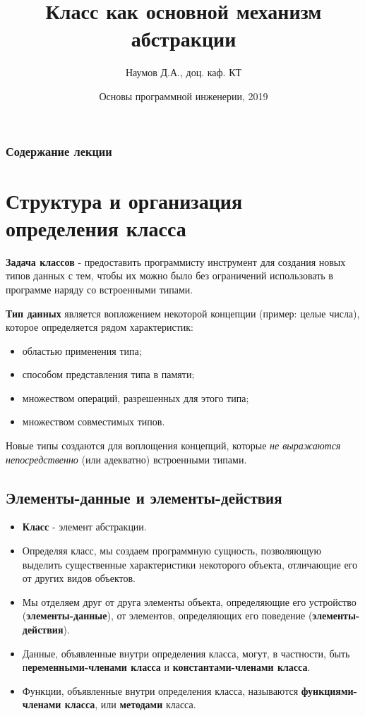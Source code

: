 \documentclass{beamer}
\title[Software Design]{Класс как основной механизм абстракции}
\author{Наумов Д.А., доц. каф. КТ}
\date[30.09.2019] {Основы программной инженерии, 2019}
\begin{document}
\begin{frame}
  \titlepage
\end{frame}
  
\begin{frame}
  \frametitle{Содержание лекции}
  \tableofcontents  
\end{frame}
  
\section{Структура и организация определения класса}
\begin{frame}
\textbf{Задача классов} - предоставить программисту инструмент для создания новых типов данных с тем, чтобы их можно было без ограничений использовать в программе наряду со встроенными типами.

\textbf{Тип данных} является вопложением некоторой концепции (пример: целые числа), которое определяется рядом характеристик:
\begin{itemize}
\item областью применения типа;
\item способом представления типа в памяти;
\item множеством операций, разрешенных для этого типа;
\item множеством совместимых типов.
\end{itemize}
Новые типы создаются для воплощения концепций, которые \textit{не выражаются непосредственно} (или адекватно) встроенными типами.
\end{frame}

\subsection{Элементы-данные и элементы-действия}
\begin{frame}
\begin{itemize}
\item \textbf{Класс} - элемент абстракции.
\item Определяя класс, мы создаем программную сущность, позволяющую выделить существенные характеристики некоторого объекта, отличающие его от других видов объектов.
\item Мы отделяем друг от друга элементы объекта, определяющие его устройство (\textbf{элементы-данные}), от элементов, определяющих его поведение (\textbf{элементы-действия}).
\item Данные, объявленные внутри определения класса, могут, в частности, быть п\textbf{еременными-членами класса} и \textbf{константами-членами класса}. 
\item Функции, объявленные внутри определения класса, называются \textbf{функциями-членами класса}, или \textbf{методами} класса.
\end{itemize}
\end{frame}
\end{document}
